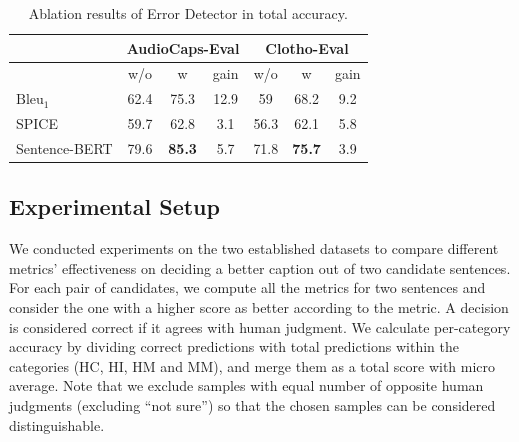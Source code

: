 \documentclass{article}
\begin{document}
\begin{table}[]
    \small
    \begin{tabular}{l|c|c|c|c|c|c} \toprule
                  & \multicolumn{3}{c|}{AudioCaps-Eval} & \multicolumn{3}{c}{Clotho-Eval} \\ \hline
                  & w/o  & w  & gain      & w/o & w     & gain      \\ \hline
    $\text{Bleu}_\text{1}$        & 62.4    & 75.3   &12.9      & 59           & 68.2       &9.2      \\
    SPICE         & 59.7    & 62.8 &3.1            & 56.3      & 62.1        &5.8        \\
    Sentence-BERT & 79.6    & \textbf{85.3}   &5.7          & 71.8            & \textbf{75.7}    &3.9         \\ \bottomrule
    \end{tabular}
    \caption{Ablation results of Error Detector in total accuracy. }
    \label{tab:fluency}
\end{table}

\subsection{Experimental Setup}
We conducted experiments on the two established datasets to compare different metrics' effectiveness on deciding a better caption out of two candidate sentences. For each pair of candidates, we compute all the metrics for two sentences and consider the one with a higher score as better according to the metric. A decision is considered correct if it agrees with human judgment. We calculate per-category accuracy by dividing correct predictions with total predictions within the categories (HC, HI, HM and MM), and merge them as a total score with micro average. Note that we exclude samples with equal number of opposite human judgments (excluding ``not sure'') so that the chosen samples can be considered distinguishable.
\end{document}
